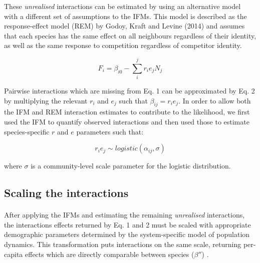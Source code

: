 \documentclass[a4,12pt]{article}
\begin{document}

        
        These \textit{unrealised} interactions can be estimated by using an alternative model with a different set of assumptions to the IFMs. This model is described as the response-effect model (REM) by Godoy, Kraft and Levine (2014) and assumes that each species has the same effect on all neighbours regardless of their identity, as well as the same response to competition regardless of competitor identity. 
        
        \begin{equation}
        F_{i} = \beta_{i0} - \sum_{i}^{j} r_{i} e_{j} N_{j}
        \label{rem1}
        \end{equation}
        
        Pairwise interactions which are missing from Eq. 1 can be approximated by Eq. 2 by multiplying the relevant $r_{i}$ and $e_{j}$ such that $\beta_{ij} = r_{i} e_{j}$. In order to allow both the IFM and REM interaction estimates to contribute to the likelihood, we first used the IFM to quantify observed interactions and then used those to estimate species-specific $r$ and $e$ parameters such that: 
    
        \begin{equation}
        r_i e_j \sim logistic \left ( \alpha_{ij}, \sigma \right )
        \label{unrealised}
        \end{equation}
    
        where $\sigma$ is a community-level scale parameter for the logistic distribution. 
        
    \subsection{Scaling the interactions}
        
        \paragraph{}
        After applying the IFMs and estimating the remaining \textit{unrealised} interactions, the interactions effects returned by Eq. 1 and 2 must be scaled with appropriate demographic parameters determined by the system-specific model of population dynamics. This transformation puts interactions on the same scale, returning per-capita effects which are directly comparable between species (${\beta}''$) \citep{Godoy2014, Bimler2018a}. 
        
\end{document}
